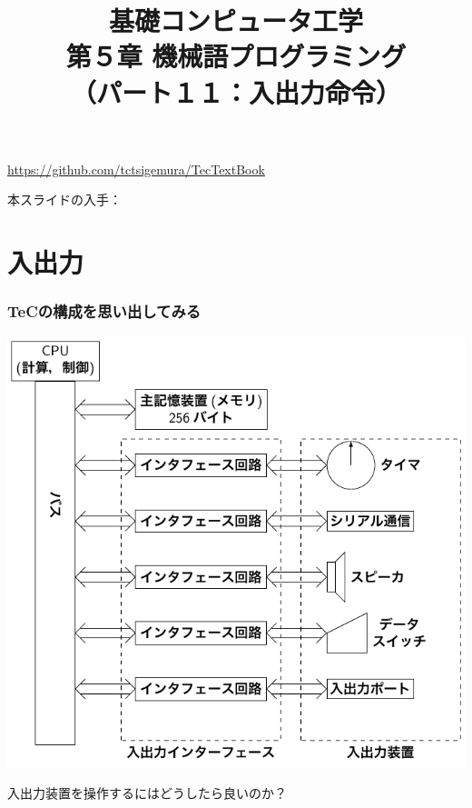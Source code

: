 \documentclass[handout]{beamer}        %
\begin{document}
\title{基礎コンピュータ工学\\第５章 機械語プログラミング\\
       （パート１１：入出力命令）}
\date{}

\begin{frame}
  \titlepage
  \centerline{\url{https://github.com/tctsigemura/TecTextBook}}
  \vfill
  \centerline{本スライドの入手：
    }
\end{frame}


\section{入出力}
\begin{frame}
  \frametitle{TeCの構成を思い出してみる}
  \centerline{\includegraphics[scale=0.67]{../Tikz/kousei2.pdf}}
  入出力装置を操作するにはどうしたら良いのか？
\end{frame}
\end{document}
